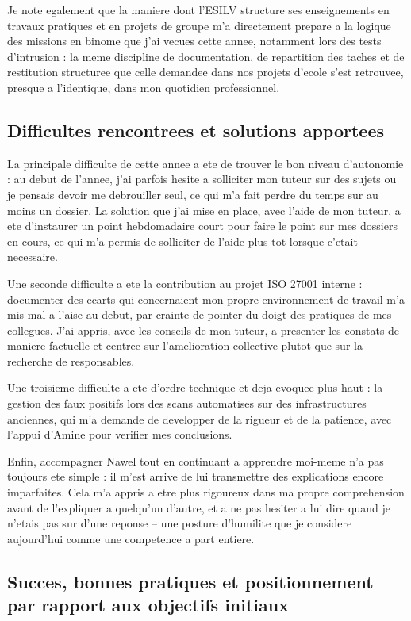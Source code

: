 \documentclass[11pt,a4paper]{article}
\begin{document}
Je note egalement que la maniere dont l'ESILV structure ses enseignements en travaux pratiques et en projets de groupe m'a directement prepare a la logique des missions en binome que j'ai vecues cette annee, notamment lors des tests d'intrusion : la meme discipline de documentation, de repartition des taches et de restitution structuree que celle demandee dans nos projets d'ecole s'est retrouvee, presque a l'identique, dans mon quotidien professionnel.

\subsection{Difficultes rencontrees et solutions apportees}

La principale difficulte de cette annee a ete de trouver le bon niveau d'autonomie : au debut de l'annee, j'ai parfois hesite a solliciter mon tuteur sur des sujets ou je pensais devoir me debrouiller seul, ce qui m'a fait perdre du temps sur au moins un dossier. La solution que j'ai mise en place, avec l'aide de mon tuteur, a ete d'instaurer un point hebdomadaire court pour faire le point sur mes dossiers en cours, ce qui m'a permis de solliciter de l'aide plus tot lorsque c'etait necessaire.

Une seconde difficulte a ete la contribution au projet ISO 27001 interne : documenter des ecarts qui concernaient mon propre environnement de travail m'a mis mal a l'aise au debut, par crainte de pointer du doigt des pratiques de mes collegues. J'ai appris, avec les conseils de mon tuteur, a presenter les constats de maniere factuelle et centree sur l'amelioration collective plutot que sur la recherche de responsables.

Une troisieme difficulte a ete d'ordre technique et deja evoquee plus haut : la gestion des faux positifs lors des scans automatises sur des infrastructures anciennes, qui m'a demande de developper de la rigueur et de la patience, avec l'appui d'Amine pour verifier mes conclusions.

Enfin, accompagner Nawel tout en continuant a apprendre moi-meme n'a pas toujours ete simple : il m'est arrive de lui transmettre des explications encore imparfaites. Cela m'a appris a etre plus rigoureux dans ma propre comprehension avant de l'expliquer a quelqu'un d'autre, et a ne pas hesiter a lui dire quand je n'etais pas sur d'une reponse -- une posture d'humilite que je considere aujourd'hui comme une competence a part entiere.

\subsection{Succes, bonnes pratiques et positionnement par rapport aux objectifs initiaux}
\end{document}

